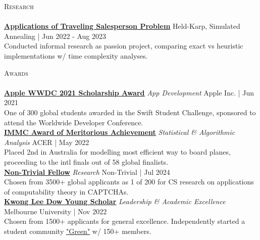 \documentclass[a4paper]{article}
\newcommand{\lineunder} {
    \vspace*{-8pt} \\
    \hspace*{-10pt} \hrulefill \\
}
\newcommand{\header} [1] {
    {\hspace*{-10pt}\vspace*{6pt} \large\textsc{#1}}
    \vspace*{-6pt} \lineunder
}
\begin{document}
\vspace*{1mm}
\header{Research}
\href{https://garv-shah.github.io/applications_of_tsp.pdf}{\textbf{\ul{Applications of Traveling Salesperson Problem}}} \hfill Held-Karp, Simulated Annealing | Jun 2022 - Aug 2023\\
Conducted informal research as passion project, comparing exact vs heuristic implementations w/ time complexity analyses. \\
\vspace*{1.5mm}

\vspace*{1mm}
\header{Awards}
\href{https://www.wwdcscholars.com/s/DF1A5147-A993-44E4-8739-8A050139A7BA/2021}{\textbf{\ul{Apple WWDC 2021 Scholarship Award}}} \textit{App Development} \hfill Apple Inc. | Jun 2021\\
One of 300 global students awarded in the Swift Student Challenge, sponsored to attend the Worldwide Developer Conference.\\
\vspace*{1.5mm}
\href{https://www.acer.org/au/discover/article/bray-park-and-caulfield-grammar-schools-top-maths-challenge}{\textbf{\ul{IMMC Award of Meritorious Achievement}}} \textit{Statistical \& Algorithmic Analysis} \hfill ACER | May 2022\\
Placed 2nd in Australia for modelling most efficient way to board planes, proceeding to the intl finals out of 58 global finalists.\\
\vspace*{1.5mm}
\href{https://www.non-trivial.org/}{\textbf{\ul{Non-Trivial Fellow}}} \textit{Research} \hfill Non-Trivial | Jul 2024\\
Chosen from 3500+ global applicants as 1 of 200 for CS research on applications of computability theory in CAPTCHAs.\\
\vspace*{1.5mm}
\href{https://www.linkedin.com/posts/caulfield-grammar-school_caulfieldgrammar2022-activity-7001816876439781376-DZpH}{\textbf{\ul{Kwong Lee Dow Young Scholar}}} \textit{Leadership \& Academic Excellence} \hfill Melbourne University | Nov 2022\\
Chosen from 1500+ applicants for general excellence.
Independently started a student community \href{https://garv-shah.github.io/green/}{"Green"} w/ 150+ members.\\
\vspace*{1.5mm}

\end{document}
